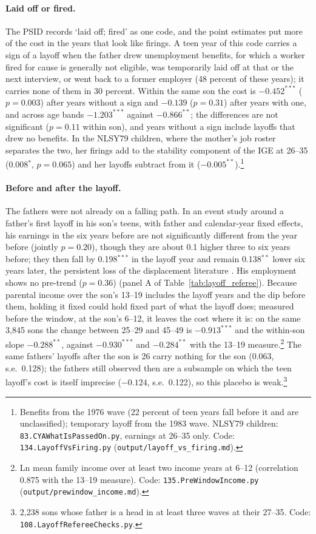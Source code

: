 \paragraph{Laid off or fired.} The PSID records `laid off; fired' as one code, and the point estimates put more of the
cost in the years that look like firings. A teen year of this code carries a sign of a layoff when the father drew
unemployment benefits, for which a worker fired for cause is generally not eligible, was temporarily laid off at that
or the next interview, or went back to a former employer (48 percent of these years); it carries none of them in 30
percent. Within the same son the cost is $-0.452^{***}$ ($p = 0.003$) after years without a sign and $-0.139$
($p = 0.31$) after years with one, and across age bands $-1.203^{***}$ against $-0.866^{**}$; the differences are not
significant ($p = 0.11$ within son), and years without a sign include layoffs that drew no benefits. In the NLSY79
children, where the mother's job roster separates the two, her firings add to the stability component of the IGE at
26--35 (0.008$^{*}$, $p = 0.065$) and her layoffs subtract from it ($-0.005^{**}$).\footnote{Benefits from the 1976 wave
(22 percent of teen years fall before it and are unclassified); temporary layoff from the 1983 wave. NLSY79 children:
\texttt{83.CYAWhatIsPassedOn.py}, earnings at 26--35 only. Code: \texttt{134.LayoffVsFiring.py}
(\texttt{output/layoff\_vs\_firing.md}).}

\paragraph{Before and after the layoff.} The fathers were not already on a falling path. In an event study around a
father's first layoff in his son's teens, with father and calendar-year fixed effects, his earnings in the six years
before are not significantly different from the year before (jointly $p = 0.20$), though they are about 0.1 higher three
to six years before; they then fall by 0.198$^{***}$ in the layoff year and remain 0.138$^{**}$ lower six years later, the
persistent loss of the displacement literature \citep{stevens1997persistent}. His employment shows no pre-trend ($p =
0.36$) (panel A of Table~\ref{tab:layoff_referee}). Because parental income over the son's 13--19 includes the
layoff years and the dip before them, holding it fixed could hold fixed part of what the layoff does; measured before
the window, at the son's 6--12, it leaves the cost where it is: on the same 3,845 sons the change between 25--29 and
45--49 is $-0.913^{***}$ and the within-son slope $-0.288^{**}$, against $-0.930^{***}$ and $-0.284^{**}$ with the
13--19 measure.\footnote{Ln mean family income over at least two income years at 6--12 (correlation 0.875 with the
13--19 measure). Code: \texttt{135.PreWindowIncome.py} (\texttt{output/prewindow\_income.md}).} The same fathers' layoffs after the son is 26 carry nothing for the
son (0.063, s.e.\ 0.128); the fathers still observed then are a subsample on which the teen layoff's cost is itself
imprecise ($-0.124$, s.e.\ 0.122), so this placebo is weak.\footnote{2,238 sons whose father is a head in at least three
waves at their 27--35. Code: \texttt{108.LayoffRefereeChecks.py}.}

